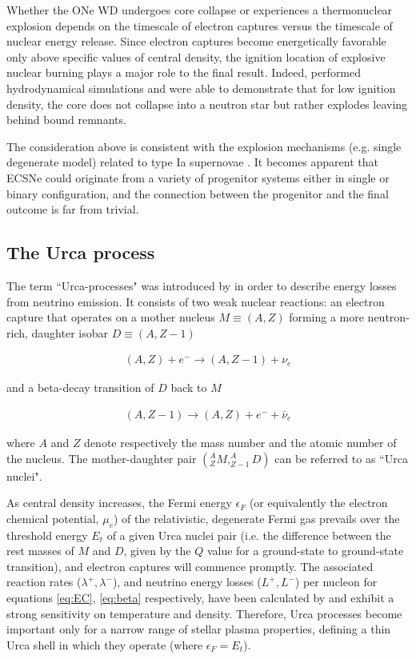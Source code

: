 \documentclass[../../main/thesis_msc.tex]{subfiles}
\begin{document}
Whether the ONe WD undergoes core collapse or experiences a thermonuclear explosion depends on the timescale of electron captures versus the timescale of nuclear energy release. Since electron captures become energetically favorable only above specific values of central density, the ignition location of explosive nuclear burning plays a major role to the final result. Indeed, \cite{Jones2016, Jones2019} performed hydrodynamical simulations and were able to demonstrate that for low ignition density, the core does not collapse into a neutron star but rather explodes leaving behind bound remnants.

The consideration above is consistent with the explosion mechanisms (e.g. single degenerate model) related to type Ia supernovae \citep[for recent reviews see][]{Hillebrandt2000, Wang2012, Wang2018, Livio2018}. It becomes apparent that ECSNe could originate from a variety of progenitor systems either in single or binary configuration, and the connection between the progenitor and the final outcome is far from trivial.


\subsection{The Urca process}
The term ``Urca-processes" was introduced by \cite{Gamow1941} in order to describe energy losses from neutrino emission. It consists of two weak nuclear reactions: an electron capture that operates on a mother nucleus $M \equiv (A,Z)$ forming a more neutron-rich, daughter isobar $D \equiv (A,Z-1)$

\begin{align}
    \label{eq:EC}
    (A,Z) + e^{-} \longrightarrow (A,Z-1) + \nu_{e}
\end{align}

\noindent and a beta-decay transition of $D$ back to $M$

\begin{align}
    \label{eq:beta}
    (A,Z-1) \longrightarrow (A,Z) + e^{-} + \bar{\nu}_e
\end{align}

\noindent where $A$ and $Z$ denote respectively the mass number and the atomic number of the nucleus. The mother-daughter pair $(^A _Z{M}, ^A _{Z-1}{D})$ can be referred to as ``Urca nuclei". 

As central density increases, the Fermi energy $\epsilon_F$ (or equivalently the electron chemical potential, $\mu_e$) of the relativistic, degenerate Fermi gas prevails over the threshold energy $E_t$ of a given Urca nuclei pair (i.e. the difference between the rest masses of $M$ and $D$, given by the $Q$ value for a ground-state to ground-state transition), and electron captures will commence promptly. The associated reaction rates ($\lambda^{+}, \lambda^{-}$), and neutrino energy losses ($L^{+}, L^{-}$) per nucleon for equations \ref{eq:EC}, \ref{eq:beta} respectively, have been calculated by \cite{Tsuruta1970} and exhibit a strong sensitivity on temperature and density. Therefore, Urca processes become important only for a narrow range of stellar plasma properties, defining a thin Urca shell in which they operate (where $\epsilon_F = E_t$).
\end{document}
